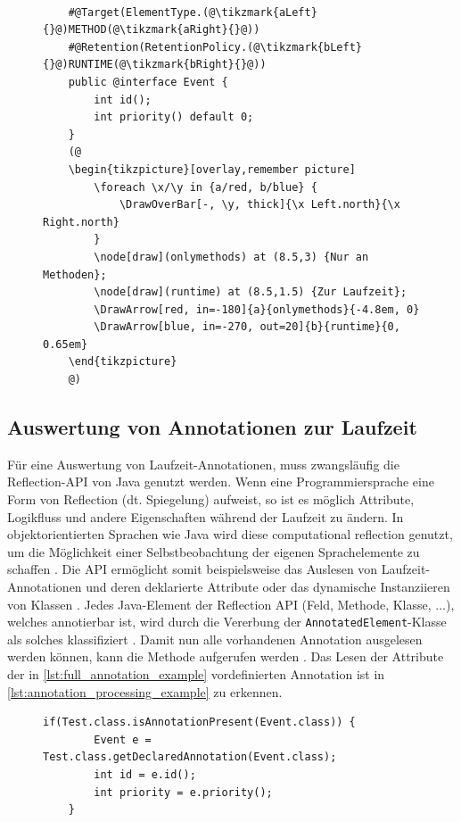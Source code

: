 \begin{figure}[H]
	\centering
	\begin{lstlisting}[caption={Beispiel einer Laufzeit Annotation.}, captionpos=b, label=lst:full_annotation_example]
	
	#@Target(ElementType.(@\tikzmark{aLeft}{}@)METHOD(@\tikzmark{aRight}{}@))
	#@Retention(RetentionPolicy.(@\tikzmark{bLeft}{}@)RUNTIME(@\tikzmark{bRight}{}@))
	public @interface Event {
		int id();
		int priority() default 0;
	}
	(@
	\begin{tikzpicture}[overlay,remember picture]
		\foreach \x/\y in {a/red, b/blue} {
			\DrawOverBar[-, \y, thick]{\x Left.north}{\x Right.north}
		}
		\node[draw](onlymethods) at (8.5,3) {Nur an Methoden};
		\node[draw](runtime) at (8.5,1.5) {Zur Laufzeit};
		\DrawArrow[red, in=-180]{a}{onlymethods}{-4.8em, 0}
		\DrawArrow[blue, in=-270, out=20]{b}{runtime}{0, 0.65em}
	\end{tikzpicture}
	@)
	\end{lstlisting}
\end{figure}
\subsection{Auswertung von Annotationen zur Laufzeit}
\label{java_annotation_laufzeitauswertung}
Für eine Auswertung von Laufzeit-Annotationen, muss zwangsläufig die Reflection-API von Java genutzt werden. Wenn eine Programmiersprache eine Form von Reflection (dt. Spiegelung) aufweist, so ist es möglich Attribute, Logikfluss und andere Eigenschaften während der Laufzeit zu ändern. In objektorientierten Sprachen wie Java wird diese \glqq computational reflection\grqq{} genutzt, um die Möglichkeit einer Selbstbeobachtung der eigenen Sprachelemente zu schaffen \cite{Li2017}. Die API ermöglicht somit beispielsweise das Auslesen von Laufzeit-Annotationen und deren deklarierte Attribute oder das dynamische Instanziieren von Klassen \cite{Forman2004}. Jedes Java-Element der Reflection API (Feld, Methode, Klasse, ...), welches annotierbar ist, wird durch die Vererbung der \texttt{AnnotatedElement}-Klasse als solches klassifiziert \cite{Schildt2019}. Damit nun alle vorhandenen Annotation ausgelesen werden können, kann die Methode  aufgerufen werden \cite{Pigula2015}. Das Lesen der Attribute der in \autoref{lst:full_annotation_example} vordefinierten Annotation ist in \autoref{lst:annotation_processing_example} zu erkennen.
\begin{figure}[H]
	\begin{lstlisting}[caption={Auslesen einer Laufzeit-Annotation.}, captionpos=b, label=lst:annotation_processing_example]
    if(Test.class.isAnnotationPresent(Event.class)) {
	    Event e = Test.class.getDeclaredAnnotation(Event.class);
	    int id = e.id();
	    int priority = e.priority();
    }
	\end{lstlisting}
\end{figure}
